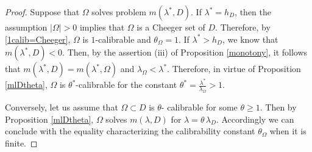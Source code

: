 \documentclass[reqno,11pt]{amsart}
\newtheorem{conjecture}[theorem]{Conjecture}
\theoremstyle{definition}
\numberwithin{equation}{section}
\DeclareMathOperator{\Div}{div}
\newcommand{\HH}{\mathcal{H}}
\newcommand{\RR}{\mathbb{R}}
\newcommand{\1}{{{\bf 1}\kern-0,28em\rm l}}
\newcommand{\one}{{{\bf 1}\kern-0,28em\rm l}}
\def\O{\Omega}
\def\l{\lambda}
\begin{document}
\begin{proof} 
Suppose that $\Omega$ solves problem $m(\lambda^*,D)$. If  $\l^*=h_D$, then the assumption $|\O|>0$ implies that $\O$ is a Cheeger set of $D$. Therefore, by \eqref{1calib=Cheeger}, $\O$ is $1$-calibrable and $\theta_\O=1$. If $\l^*>h_D$, we know that $m(\l^*,D)<0$. Then, by the assertion (iii) of Proposition \ref{monotony}, it follows  that  $m(\l^*,D)= m(\l^*,\O)$ and $\lambda_\Omega < \lambda^*$. Therefore, in virtue of Proposition \ref {mlDtheta}, 
 $\O$ is $\theta^*$-calibrable for the constant $\theta^*= \frac{\lambda^*}{\lambda_\Omega} >1$. 
 
 Conversely, let us assume that $\O\subset D$ is  $\theta$- calibrable for  some $\theta \ge 1$. Then by Proposition \ref {mlDtheta}, $\O$ solves $m(\l,D)$ for $\l=\theta\, \l_D$.  Accordingly we can conclude with the equality characterizing the calibrability constant $\theta_\O$ when it is finite.  
 
\end{proof}
%
%
%
%
%
\end{document}
